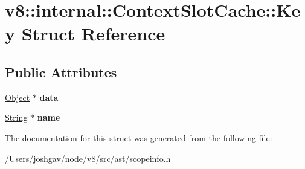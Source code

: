 \hypertarget{structv8_1_1internal_1_1_context_slot_cache_1_1_key}{}\section{v8\+:\+:internal\+:\+:Context\+Slot\+Cache\+:\+:Key Struct Reference}
\label{structv8_1_1internal_1_1_context_slot_cache_1_1_key}
\subsection*{Public Attributes}
\begin{DoxyCompactItemize}
\item 
\hyperlink{classv8_1_1internal_1_1_object}{Object} $\ast$ {\bfseries data}\hypertarget{structv8_1_1internal_1_1_context_slot_cache_1_1_key_a9fff5e88089cc770e9343ac5b3f48f9e}{}\label{structv8_1_1internal_1_1_context_slot_cache_1_1_key_a9fff5e88089cc770e9343ac5b3f48f9e}

\item 
\hyperlink{classv8_1_1internal_1_1_string}{String} $\ast$ {\bfseries name}\hypertarget{structv8_1_1internal_1_1_context_slot_cache_1_1_key_ae62c6fee8885d2db26bc1a4852240bed}{}\label{structv8_1_1internal_1_1_context_slot_cache_1_1_key_ae62c6fee8885d2db26bc1a4852240bed}

\end{DoxyCompactItemize}


The documentation for this struct was generated from the following file\+:\begin{DoxyCompactItemize}
\item 
/\+Users/joshgav/node/v8/src/ast/scopeinfo.\+h\end{DoxyCompactItemize}
